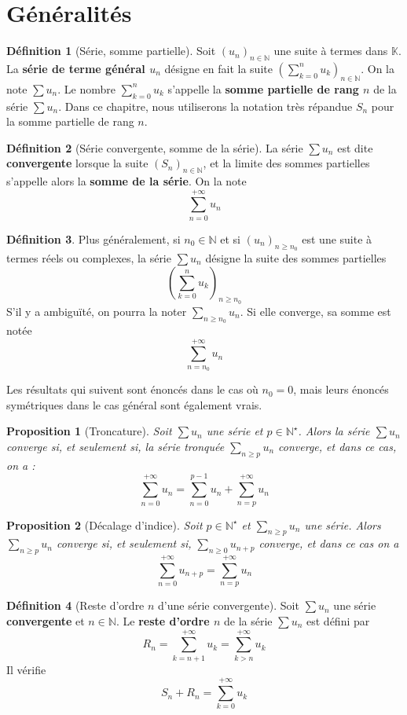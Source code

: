 \documentclass[french]{book}
\newcommand{\N}{\mathbb{N}}
\newcommand{\K}{\mathbb{K}}
\newcommand{\st}{^\star}
\theoremstyle{plain}
\newtheorem{prop}{Proposition}[chapter]
\theoremstyle{definition}
\newtheorem{dfn}{Définition}[chapter]
\theoremstyle{remark}
\begin{document}
\section{Généralités}
\begin{dfn}[Série, somme partielle]
	Soit $(u_n)_{n\in\N}$ une suite à termes dans $\K$. La \textbf{série de terme général $u_n$} désigne en fait la suite $\displaystyle \left(\sum_{k=0}^{n}u_k\right)_{n\in\N}$. On la note $\displaystyle \sum u_n$. Le nombre $\displaystyle\sum_{k=0}^{n}u_k$ s'appelle la \textbf{somme partielle de rang $n$} de la série $\displaystyle \sum u_n$. Dans ce chapitre, nous utiliserons la notation très répandue $S_n$ pour la somme partielle de rang $n$.
\end{dfn}
\begin{dfn}[Série convergente, somme de la série]
	La série $\displaystyle \sum u_n$ est dite \textbf{convergente} lorsque la suite $(S_n)_{n\in\N}$, et la limite des sommes partielles s'appelle alors la \textbf{somme de la série}. On la note $$\sum_{n=0}^{+\infty}u_n$$
\end{dfn}
\begin{dfn}
	Plus généralement, si $n_0\in\N$ et si $(u_n)_{n\geqslant n_0}$ est une suite à termes réels ou complexes, la série $\displaystyle \sum u_n$ désigne la suite des sommes partielles $$\left(\sum_{k=0}^{n}u_k\right)_{n\geqslant n_0}$$ S'il y a ambiguïté, on pourra la noter $\displaystyle \sum_{n\geqslant n_0}u_n$. Si elle converge, sa somme est notée $$\sum_{n=n_0}^{+\infty}u_n$$
\end{dfn}
Les résultats qui suivent sont énoncés dans le cas où $n_0=0$, mais leurs énoncés symétriques dans le cas général sont également vrais.
\begin{prop}[Troncature]
	Soit $\displaystyle \sum u_n$ une série et $p\in\N\st$. Alors la série $\displaystyle \sum u_n$ converge si, et seulement si, la série tronquée $\displaystyle \sum_{n\geqslant p} u_n$ converge, et dans ce cas, on a : $$\sum_{n=0}^{+\infty}u_n=\sum_{n=0}^{p-1}u_n+\sum_{n=p}^{+\infty}u_n$$
\end{prop}
\begin{prop}[Décalage d'indice]
	Soit $p\in\N\st$ et $\displaystyle \sum_{n\geqslant p}u_n$ une série. Alors $\displaystyle \sum_{n\geqslant p}u_n$ converge si, et seulement si, $\displaystyle \sum_{n\geqslant 0}u_{n+p}$ converge, et dans ce cas on a $$\sum_{n=0}^{+\infty}u_{n+p}=\sum_{n=p}^{+\infty}u_n$$
\end{prop}
\begin{dfn}[Reste d'ordre $n$ d'une série convergente]
	Soit $\displaystyle \sum u_n$ une série \textbf{convergente} et $n\in\N$. Le \textbf{reste d'ordre $n$} de la série $\displaystyle \sum u_n$ est défini par $$R_n=\sum_{k=n+1}^{+\infty}u_k=\sum_{k>n}^{+\infty}u_k$$ Il vérifie $$S_n+R_n=\sum_{k=0}^{+\infty}u_k$$
\end{dfn}
\end{document}
